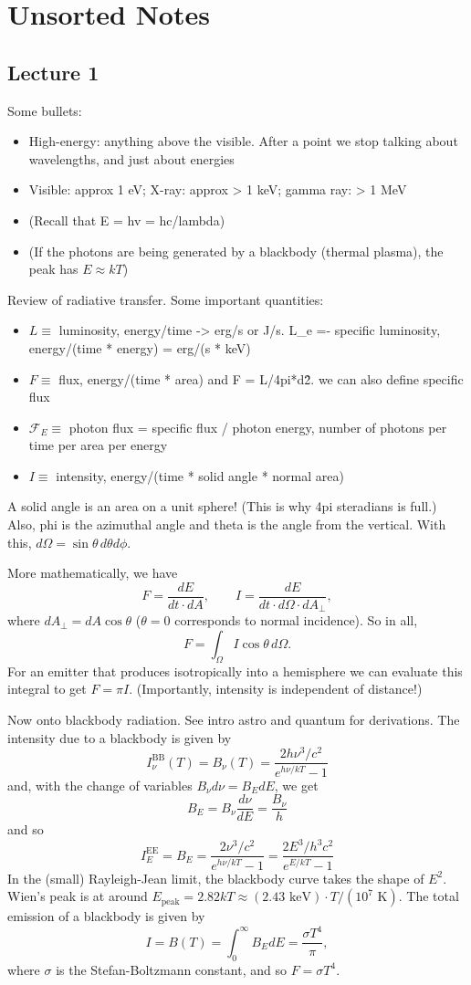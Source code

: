 \documentclass[../a122main.tex]{subfiles}
\begin{document}
\chapter{Unsorted Notes}
\section{Lecture 1}
Some bullets:
\begin{itemize}[topsep=0pt]
    \item High-energy: anything above the visible. After a point we stop talking about wavelengths, and just about energies
    \item Visible: approx 1 eV; X-ray: approx > 1 keV; gamma ray: > 1 MeV
    \item (Recall that E = hv = hc/lambda)
    \item (If the photons are being generated by a blackbody (thermal plasma), the peak has $E \approx kT$)
\end{itemize}
Review of radiative transfer. Some important quantities:
\begin{itemize}[topsep=0pt]
    \item $L \equiv$ luminosity, energy/time -> erg/s or J/s. L\_e =- specific luminosity, energy/(time * energy) = erg/(s * keV)
    \item $F \equiv$ flux, energy/(time * area) and F = L/4pi*d\^2. we can also define specific flux
    \item $\mathcal F_E \equiv$ photon flux = specific flux / photon energy, number of photons per time per area per energy
    \item $I \equiv$ intensity, energy/(time * solid angle * normal area)
\end{itemize}
A solid angle is an area on a unit sphere! (This is why 4pi steradians is full.)
Also, phi is the azimuthal angle and theta is the angle from the vertical.
With this, $d\Omega = \sin \theta \, d\theta d\phi$.

More mathematically, we have
\[ F = \frac{dE}{dt \cdot dA}, \qquad I = \frac{dE}{dt \cdot d\Omega \cdot dA_\perp}, \]
where $dA_\perp = dA \cos \theta$ ($\theta = 0$ corresponds to normal incidence).
So in all,
\[ F = \int_{\Omega}^{} I \cos \theta \, d\Omega. \]
For an emitter that produces isotropically into a hemisphere we can evaluate this integral to get $F = \pi I$.
(Importantly, intensity is independent of distance!)

Now onto blackbody radiation.
See intro astro and quantum for derivations.
The intensity due to a blackbody is given by
\[ I_\nu^\textrm{BB}(T) = B_\nu(T) = \frac{2h\nu^3 / c^2}{e^{h\nu / kT} - 1} \]
and, with the change of variables $B_\nu d\nu = B_E dE$, we get
\[ B_E = B_\nu \frac{d\nu}{dE} = \frac{B_\nu}{h} \]
and so
\[ I_E^\textrm{EE} = B_E = \frac{2\nu^3 / c^2}{e^{h\nu / kT} - 1} = \frac{2E^3 / h^3 c^2}{e^{E / kT} - 1} \]
In the (small) Rayleigh-Jean limit, the blackbody curve takes the shape of $E^2$.
Wien's peak is at around $E_\textrm{peak} = 2.82 kT \approx (2.43 \textrm{ keV}) \cdot T / (10^{7} \textrm{ K})$.
The total emission of a blackbody is given by
\[ I = B(T) = \int_{0}^{\infty} B_E dE = \frac{\sigma T^{4}}{\pi}, \]
where $\sigma$ is the Stefan-Boltzmann constant, and so $F = \sigma T^{4}$.
\end{document}
